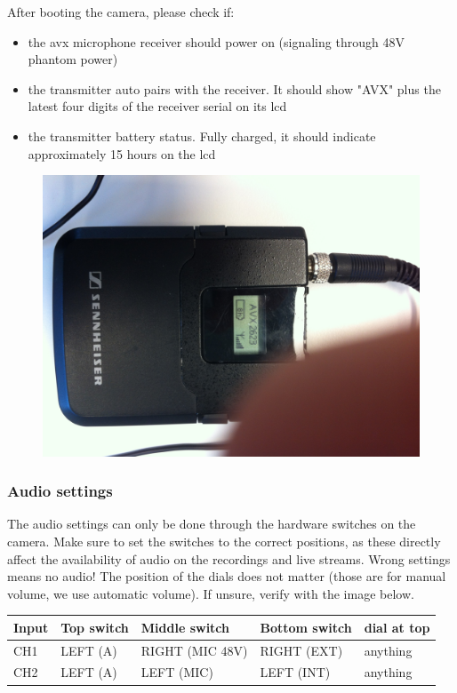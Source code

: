 \documentclass{article}
\begin{document}
After booting the camera, please check if:
\begin{itemize}
  \item the avx microphone receiver should power on (signaling through 48V phantom power)
  \item the transmitter auto pairs with the receiver. It should show "AVX" plus the latest four digits of the receiver serial on its lcd
  \item the transmitter battery status. Fully charged, it should indicate approximately 15 hours on the lcd
\end{itemize}

\begin{figure}[H]
  \centering
\includegraphics[width = 120mm]{paired_avx.jpg}
\end{figure}


\subsubsection{Audio settings}
The audio settings can only be done through the hardware switches on the camera.
Make sure to set the switches to the correct positions, as these directly affect the availability of audio on the recordings and live streams. Wrong settings means no audio!
The position of the dials does not matter (those are for manual volume, we use automatic volume).
If unsure, verify with the image below.

\begin{tabular}{| l || l | l | l | l |}
Input & Top switch & Middle switch & Bottom switch & dial at top \\ \hline
CH1 & LEFT (A) & RIGHT (MIC 48V) & RIGHT (EXT) & anything \\
CH2 & LEFT (A) & LEFT (MIC) & LEFT (INT) & anything \\
\end{tabular}
\end{document}
